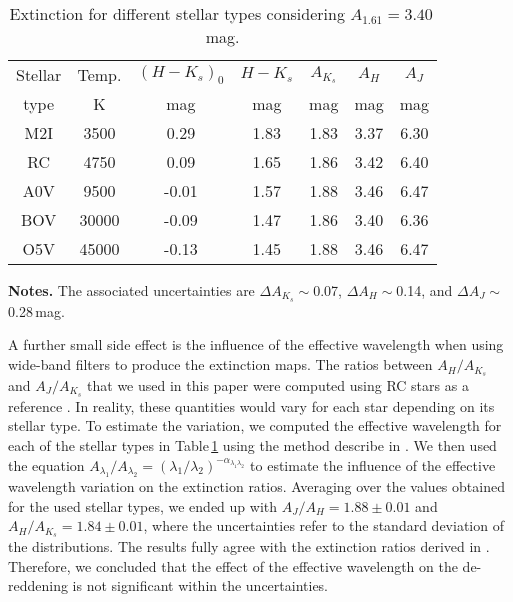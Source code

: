 \documentclass{aa}
\begin{document}
\begin{table}
\caption{Extinction for different stellar types considering $A_{1.61}=3.40$\,mag.}
\label{stellar_types} 
\begin{center}
\def\arraystretch{1.4}
\setlength{\tabcolsep}{3.8pt}

\begin{tabular}{ccccccc}
 &  &  & & & &\tabularnewline
\hline 
\hline 
Stellar  & Temp. & $(H-K_s)_0$ & $H-K_s$ & $A_{K_s}$& $A_{H}$ & $A_{J}$\tabularnewline
type & K & mag & mag & mag & mag & mag\tabularnewline
\hline 
M2I & 3500 & 0.29 & 1.83 & 1.83& 3.37&6.30\tabularnewline
RC & 4750 & 0.09 & 1.65 & 1.86& 3.42&6.40\tabularnewline
A0V & 9500 & -0.01 & 1.57 & 1.88& 3.46&6.47\tabularnewline
BOV & 30000 & -0.09 & 1.47 & 1.86& 3.40&6.36\tabularnewline
O5V & 45000 & -0.13 & 1.45 & 1.88& 3.46&6.47\tabularnewline
\hline 
\end{tabular}

\end{center}
\footnotesize
\textbf{Notes.} The associated uncertainties are $\Delta A_{K_s}\sim$0.07, $\Delta A_{H}\sim$0.14, and $\Delta A_{J}\sim$0.28\,mag. 

 \end{table}




A further small side effect is the influence of the effective wavelength when using wide-band filters to produce the extinction maps. The ratios between $A_H/A_{K_s}$ and $A_J/A_{K_s}$ that we used in this paper were computed using RC stars as a reference \citep[see][]{Nogueras-Lara:2019ac,Nogueras-Lara:2020aa}. In reality, these quantities would vary for each star depending on its stellar type. To estimate the variation, we computed the effective wavelength for each of the stellar types in Table\,\ref{stellar_types} using the method describe in \citet{Nogueras-Lara:2018aa}. We then used the equation $A_{\lambda_1}/A_{\lambda_2} = (\lambda_1/\lambda_2)^{-\alpha_{\lambda_1\lambda_2}}$ \citep{Nogueras-Lara:2020aa} to estimate the influence of the effective wavelength variation on the extinction ratios. Averaging over the values obtained for the used stellar types, we ended up with $A_J/A_H=1.88\pm0.01$ and $A_H/A_{K_s}=1.84\pm0.01$, where the uncertainties refer to the standard deviation of the distributions. The results fully agree with the extinction ratios derived in \citet{Nogueras-Lara:2020aa}. Therefore, we concluded that the effect of the effective wavelength on the de-reddening is not significant within the uncertainties. 
\end{document}
